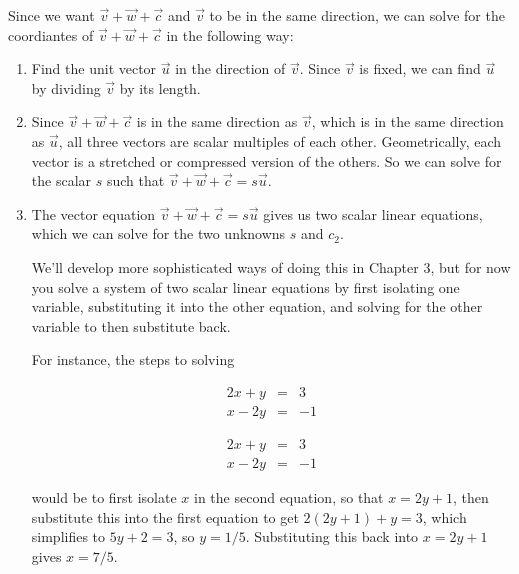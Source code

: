 \documentclass{ximera}
\begin{document}
\begin{problem}
  Since we want $\vec{v}+\vec{w}+\vec{c}$ and $\vec{v}$ to be in the same direction, we can solve for the coordiantes of $\vec{v}+\vec{w}+\vec{c}$ in the following way: 

\begin{enumerate}

\item Find the unit vector $\vec{u}$ in the direction of $\vec{v}$. Since $\vec{v}$ is fixed, we can find $\vec{u}$ by dividing $\vec{v}$ by its length.
\item Since $\vec{v}+\vec{w}+\vec{c}$ is in the same direction as $\vec{v}$, which is in the same direction as $\vec{u}$, all three vectors are scalar multiples of each other. Geometrically, each vector is a stretched or compressed version of the others. So we can solve for the scalar $s$ such that $\vec{v}+\vec{w}+\vec{c}=s\vec{u}$.
\item The vector equation $\vec{v}+\vec{w}+\vec{c}=s\vec{u}$ gives us two scalar linear equations, which we can solve for the two unknowns $s$ and $c_2$.

\begin{hint}

  We'll develop more sophisticated ways of doing this in Chapter 3, but for now you solve a system of two scalar linear equations by first isolating one variable, substituting it into the other equation, and solving for the other variable to then substitute back.

  For instance, the steps to solving 

  \[
  \begin{array}{ccc}
    2x+y&=&3\\
    x-2y&=&-1
  \end{array}
  \]

  $$
    \begin{array}{ccc}
      2x+y & = &  3 \\
      x-2y & = & -1
    \end{array}
  $$

  would be to first isolate $x$ in the second equation, so that $x=2y+1$, then substitute this into the first equation to get $2(2y+1)+y=3$, which simplifies to $5y+2=3$, so $y=1/5$. Substituting this back into $x=2y+1$ gives $x=7/5$.

\end{hint}

\end{enumerate}

  \begin{solution}


\end{solution}
\end{problem}
\end{document}
